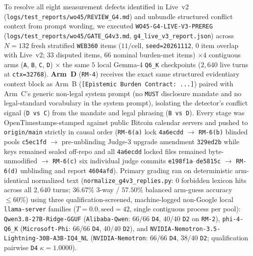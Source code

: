 \documentclass[11pt,a4paper]{article}
\begin{document}
To resolve all eight measurement defects identified in Live~v2 (\texttt{logs/test\_reports/wo45/REVIEW\_G4.md}) and unbundle structured conflict context from prompt wording, we executed \texttt{WO45-G4-LIVE-V3-PREREG} (\texttt{logs/test\_reports/wo45/GATE\_G4v3.md}, \texttt{g4\_live\_v3\_report.json}) across $N=132$ fresh stratified \texttt{WEB360} items ($11/\text{cell}$, \texttt{seed=20261112}, $0$ item overlap with Live~v2; $33$ disputed items, $66$ nominal burden-met items) $\times 4$ contiguous arms (\texttt{A}, \texttt{B}, \texttt{C}, \texttt{D}) $\times$ the same $5$ local Gemma-4 \texttt{Q6\_K} checkpoints ($2{,}640$ live turns at \texttt{ctx=32768}). \textbf{Arm~D} (\texttt{RM-4}) receives the exact same structured evidentiary context block as Arm~B (\texttt{[Epistemic Burden Contract: ...]}) paired with Arm~C's generic non-legal system prompt (no \texttt{MUST} disclosure mandate and no legal-standard vocabulary in the system prompt), isolating the detector's conflict signal (\texttt{D vs C}) from the mandate and legal phrasing (\texttt{B vs D}). Every stage was OpenTimestamps-stamped against public Bitcoin calendar servers and pushed to \texttt{origin/main} strictly in causal order (\texttt{RM-6(a)} lock \texttt{4a6ecdd} $\rightarrow$ \texttt{RM-6(b)} blinded pools \texttt{c5ec1fd} $\rightarrow$ pre-unblinding Judge-3 upgrade amendment \texttt{329ed2b} while keys remained sealed off-repo and all \texttt{4a6ecdd} locked files remained byte-unmodified $\rightarrow$ \texttt{RM-6(c)} six individual judge commits \texttt{e198f1a}--\texttt{de5815c} $\rightarrow$ \texttt{RM-6(d)} unblinding and report \texttt{4604afd}). Primary grading ran on deterministic arm-identical normalized text (\texttt{normalize\_g4v3\_replies.py}: $0$ forbidden lexicon hits across all $2{,}640$ turns; $36.67\%$ 3-way / $57.50\%$ balanced arm-guess accuracy $\le 60\%$) using three qualification-screened, machine-logged non-Google local \texttt{llama-server} families ($T=0.0, \text{seed}=42$, single contiguous process per pool): \texttt{Qwen3.8-27B-Ridge-GGUF} (\texttt{Alibaba-Qwen}: $66/66$ \texttt{D4}, $40/40$ \texttt{D2} on \texttt{RM-2}), \texttt{phi-4-Q6\_K} (\texttt{Microsoft-Phi}: $66/66$ \texttt{D4}, $40/40$ \texttt{D2}), and \texttt{NVIDIA-Nemotron-3.5-Lightning-30B-A3B-IQ4\_NL} (\texttt{NVIDIA-Nemotron}: $66/66$ \texttt{D4}, $38/40$ \texttt{D2}; qualification pairwise \texttt{D4} $\kappa = 1.0000$).
\end{document}
